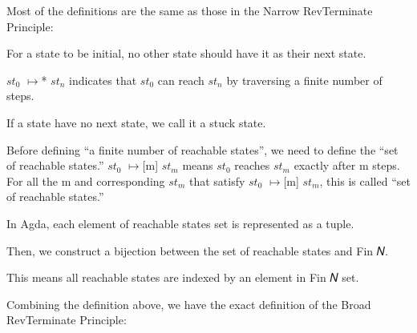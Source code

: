 Most of the definitions are the same as those in the Narrow RevTerminate Principle:

For a state to be initial, no other state should have it as their next state.


$st_{0}$ $\mapsto$* $st_{n}$ indicates that $st_{0}$ can reach $st_{n}$ by traversing a finite number of steps.


If a state have no next state, we call it a stuck state.


Before defining ``a finite number of reachable states'', we need to define the ``set of reachable states.''
$st_{0}$ $\mapsto$[m] $st_{m}$ means $st_{0}$ reaches $st_{m}$ exactly after m steps.
For all the m and corresponding $st_{m}$ that satisfy $st_{0}$ $\mapsto$[m] $st_{m}$, this is called ``set of reachable states.''


In Agda, each element of reachable states set is represented as a tuple. 


Then, we construct a bijection between the set of reachable states and Fin 𝑁.


This means all reachable states are indexed by an element in Fin 𝑁 set.


Combining the definition above, we have the exact definition of the Broad RevTerminate Principle:

